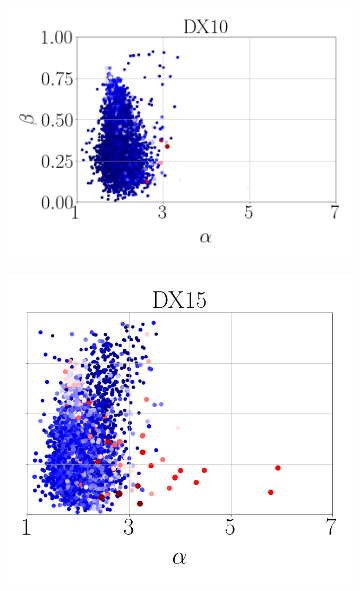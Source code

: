 \begin{figure}[ht]
\centering
\begin{subfigure}[b]{0.4\textwidth}
	\centering
	\hspace*{-0.2in}
   \includegraphics[scale=0.3]{./part3_applications/figures_ch8_resolved/SPRAY_characterization/deformation/scatter_alpha_beta_DX10.png}
\end{subfigure}
\begin{subfigure}[b]{0.4\textwidth}
	\centering
	\hspace*{0.35in}
   \includegraphics[scale=0.3]{./part3_applications/figures_ch8_resolved/SPRAY_characterization/deformation/scatter_alpha_beta_DX15.png}

\end{subfigure}
\end{figure}
